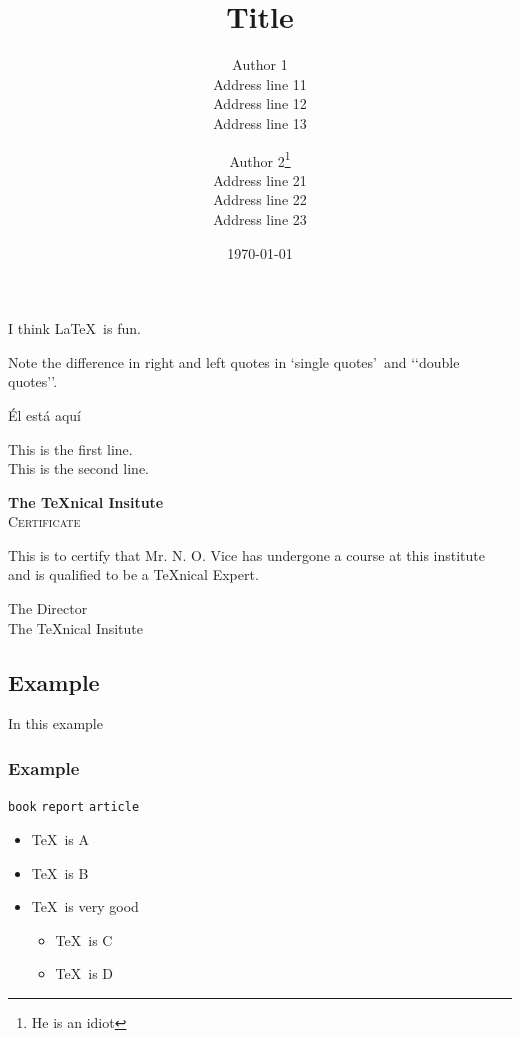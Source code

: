 \documentclass[11pt, oneside]{article}   	%
\title{Title}
\author{
	Author 1\\Address line 11\\Address line 12\\Address line 13
	\and
	Author 2\thanks{He is an idiot}\\Address line 21\\Address line 22\\Address line 23
	}
\date{\today}
\begin{document}
\maketitle

I think \LaTeX\ is fun.

Note the difference in right and left quotes in \lq single quotes\rq\ and \lq\lq double quotes\rq\rq.

\'{E}l est\'{a} aqu\'{i}

\noindent This is the first line.\\
[10 pt]
This is the second line.

\begin{center}
	{\bfseries\huge The \TeX nical Insitute}\\[1cm]
	{\scshape\LARGE Certificate}
\end{center}

\noindent This is to certify that Mr. N. O. Vice has undergone a course at this institute and is qualified to be a \TeX nical Expert.
\begin{flushright}
	{\sffamily The Director\\
	The \TeX nical Insitute}
\end{flushright}

\subsection{Example}
In this example

\subsubsection{Example}
\texttt{book}
\texttt{report}
\texttt{article}

{\renewcommand{\labelitemi}{$\triangleright$}
\begin{itemize}
	\item \TeX\ is A
	\item \TeX\ is B
	\item \TeX\ is very good
	\begin{itemize}
		\item \TeX\ is C
		\item \TeX\ is D
	\end{itemize}
\end{itemize}}
\end{document}
